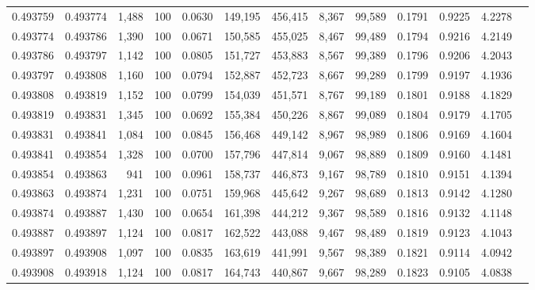 \begin{tabular}{rrrrrrrrrrrrr}
0.493759 & 0.493774 & 1,488 & 100 &                                     0.0630 & 149,195 & 456,415 &   8,367 &  99,589 & 0.1791 & 0.9225 & 4.2278 \\
0.493774 & 0.493786 & 1,390 & 100 &                                     0.0671 & 150,585 & 455,025 &   8,467 &  99,489 & 0.1794 & 0.9216 & 4.2149 \\
0.493786 & 0.493797 & 1,142 & 100 &                                     0.0805 & 151,727 & 453,883 &   8,567 &  99,389 & 0.1796 & 0.9206 & 4.2043 \\
0.493797 & 0.493808 & 1,160 & 100 &                                     0.0794 & 152,887 & 452,723 &   8,667 &  99,289 & 0.1799 & 0.9197 & 4.1936 \\
0.493808 & 0.493819 & 1,152 & 100 &                                     0.0799 & 154,039 & 451,571 &   8,767 &  99,189 & 0.1801 & 0.9188 & 4.1829 \\
0.493819 & 0.493831 & 1,345 & 100 &                                     0.0692 & 155,384 & 450,226 &   8,867 &  99,089 & 0.1804 & 0.9179 & 4.1705 \\
0.493831 & 0.493841 & 1,084 & 100 &                                     0.0845 & 156,468 & 449,142 &   8,967 &  98,989 & 0.1806 & 0.9169 & 4.1604 \\
0.493841 & 0.493854 & 1,328 & 100 &                                     0.0700 & 157,796 & 447,814 &   9,067 &  98,889 & 0.1809 & 0.9160 & 4.1481 \\
0.493854 & 0.493863 &   941 & 100 &                                     0.0961 & 158,737 & 446,873 &   9,167 &  98,789 & 0.1810 & 0.9151 & 4.1394 \\
0.493863 & 0.493874 & 1,231 & 100 &                                     0.0751 & 159,968 & 445,642 &   9,267 &  98,689 & 0.1813 & 0.9142 & 4.1280 \\
0.493874 & 0.493887 & 1,430 & 100 &                                     0.0654 & 161,398 & 444,212 &   9,367 &  98,589 & 0.1816 & 0.9132 & 4.1148 \\
0.493887 & 0.493897 & 1,124 & 100 &                                     0.0817 & 162,522 & 443,088 &   9,467 &  98,489 & 0.1819 & 0.9123 & 4.1043 \\
0.493897 & 0.493908 & 1,097 & 100 &                                     0.0835 & 163,619 & 441,991 &   9,567 &  98,389 & 0.1821 & 0.9114 & 4.0942 \\
0.493908 & 0.493918 & 1,124 & 100 &                                     0.0817 & 164,743 & 440,867 &   9,667 &  98,289 & 0.1823 & 0.9105 & 4.0838 \\

\end{tabular}

